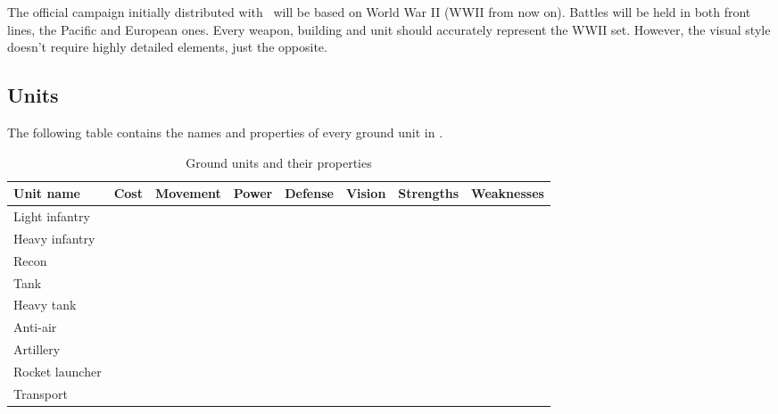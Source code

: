 The official campaign initially distributed with \game\ will be based on World
War II (WWII from now on). Battles will be held in both front lines, the Pacific
and European ones. Every weapon, building and unit should accurately represent
the WWII set. However, the visual style doesn't require highly detailed
elements, just the opposite.\\

\subsection{Units}


The following table contains the names and properties of every ground unit in
\game.\\

\begin{table}[H]
    \label{tab:ground-units}
    \begin{center}
    \begin{tabular}{| l | m{1cm} | m{1.7cm} | m{1.0cm} | m{1.5cm} | m{1.1cm} | m{2.5cm} | m{2.5cm} |}
        \hline
        \textbf{Unit name} & \textbf{Cost} & \textbf{Movement} & \textbf{Power} & \textbf{Defense} & \textbf{Vision} & \textbf{Strengths} & \textbf{Weaknesses} \\
        \hline
        Light infantry &  &  &  &  &  &  &  \\
        \hline
        Heavy infantry &  &  &  &  &  &  &  \\
        \hline
        Recon &  &  &  &  &  &  &  \\
        \hline
        Tank &  &  &  &  &  &  &  \\
        \hline
        Heavy tank &  &  &  &  &  &  &  \\
        \hline
        Anti-air &  &  &  &  &  &  &  \\
        \hline
        Artillery &  &  &  &  &  &  &  \\
        \hline
        Rocket launcher &  &  &  &  &  &  &  \\
        \hline
        Transport &  &  &  &  &  &  &  \\
        \hline
    \end{tabular}
    \end{center}
\caption{Ground units and their properties}
\end{table}

